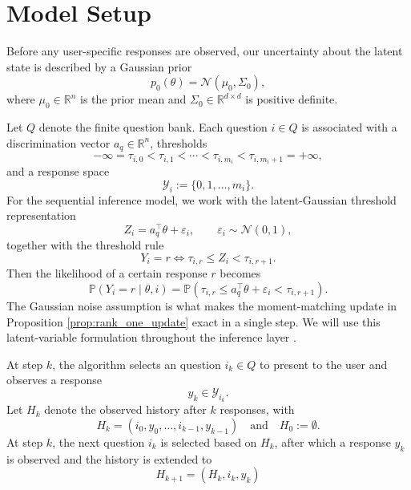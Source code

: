 \documentclass{article}
\begin{document}
\section{Model Setup}

Before any user-specific responses are observed, our uncertainty about the latent state is
described by a Gaussian prior
\begin{equation*}
p_0(\theta)=\mathcal N(\mu_0,\Sigma_0),
\end{equation*}
where $\mu_0\in\mathbb R^n$ is the prior mean and $\Sigma_0\in\mathbb R^{d\times d}$ is
positive definite.

Let $Q$ denote the finite question bank. Each question $i\in Q$ is associated with a
discrimination vector $a_q\in\mathbb R^n$, thresholds
\begin{equation*}
-\infty=\tau_{i,0}<\tau_{i,1}<\cdots<\tau_{i,m_i}<\tau_{i,m_i+1}=+\infty,
\end{equation*}
and a response space
\begin{equation*}
\mathcal Y_i:=\{0,1,\dots,m_i\}.
\end{equation*}
For the sequential inference model, we work with the latent-Gaussian threshold representation
\begin{equation*}
Z_i=a_q^\top\theta+\varepsilon_i,
\qquad
\varepsilon_i\sim\mathcal N(0,1),
\end{equation*}
together with the threshold rule
\begin{equation*}
Y_i=r
\iff
\tau_{i,r}\le Z_i<\tau_{i,r+1}.
\end{equation*}
Then the likelihood of a certain response $r$ becomes
\begin{equation*}
\mathbb P(Y_i=r\mid \theta,i)
=
\mathbb P\!\left(\tau_{i,r}\le a_q^\top\theta+\varepsilon_i<\tau_{i,r+1}\right).
\end{equation*}
The Gaussian noise assumption is what makes the moment-matching update in Proposition \ref{prop:rank_one_update} exact in a single step.
We will use this latent-variable formulation throughout the inference layer \cite{albert1993bayesian}. 

At step $k$, the algorithm selects an question $i_k\in Q$ to present to the user and observes a response
\begin{equation*}
y_k\in\mathcal Y_{i_k}.
\end{equation*}
Let $H_k$ denote the observed history after $k$ responses, with
\begin{equation*}
H_k=(i_0,y_0,\dots,i_{k-1},y_{k-1}) \quad \text{and}\quad H_0 := \emptyset.
\end{equation*}
At step $k$, the next question $i_k$ is selected based on $H_k$, after which a response $y_k$ is observed and the history is extended to 
\begin{equation}
    H_{k+1} = (H_k, i_k, y_k)
\end{equation}
\end{document}
